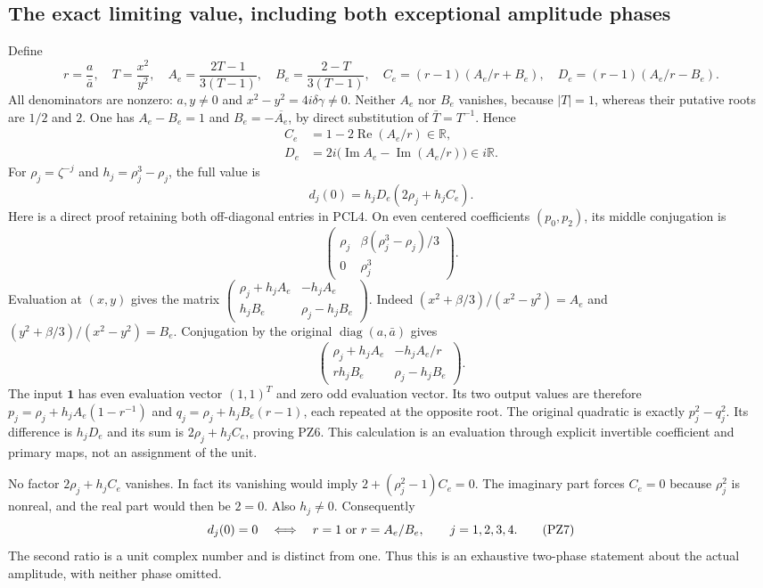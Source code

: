 \subsection{The exact limiting value, including both exceptional amplitude phases}
Define
\[
 r=\frac a{\bar a},\quad T=\frac{x^2}{y^2},\quad
 A_e=\frac{2T-1}{3(T-1)},\quad B_e=\frac{2-T}{3(T-1)},
 \quad C_e=(r-1)(A_e/r+B_e),\quad
 D_e=(r-1)(A_e/r-B_e).
 \tag{PZ4}
\]
All denominators are nonzero: $a,y\ne0$ and
$x^2-y^2=4i\delta\gamma\ne0$. Neither $A_e$ nor $B_e$ vanishes,
because $|T|=1$, whereas their putative roots are $1/2$ and $2$.
One has $A_e-B_e=1$ and $B_e=-\overline{A_e}$, by direct
substitution of $\bar T=T^{-1}$. Hence
\[
 \begin{split}
 C_e&=1-2\operatorname{Re}(A_e/r)\in\mathbb R,\\
 D_e&=2i\bigl(\operatorname{Im}A_e-
                      \operatorname{Im}(A_e/r)\bigr)\in i\mathbb R.
 \end{split}\tag{PZ5}
\]
For $\rho_j=\zeta^{-j}$ and $h_j=\rho_j^3-\rho_j$, the full value is
\[
 \boxed{\quad d_j(0)=h_jD_e(2\rho_j+h_jC_e).\quad}
 \tag{PZ6}
\]
Here is a direct proof retaining both off-diagonal entries in PCL4.
On even centered coefficients $(p_0,p_2)$, its middle conjugation is
\[
 \begin{pmatrix}\rho_j&\beta(\rho_j^3-\rho_j)/3\\0&\rho_j^3\end{pmatrix}.
\]
Evaluation at $(x,y)$ gives the matrix
$\left(\begin{smallmatrix}\rho_j+h_jA_e&-h_jA_e\\
h_jB_e&\rho_j-h_jB_e\end{smallmatrix}\right)$.
Indeed $(x^2+\beta/3)/(x^2-y^2)=A_e$ and
$(y^2+\beta/3)/(x^2-y^2)=B_e$. Conjugation by the original
$\operatorname{diag}(a,\bar a)$ gives
\[
 \begin{pmatrix}\rho_j+h_jA_e&-h_jA_e/r\\
 rh_jB_e&\rho_j-h_jB_e\end{pmatrix}.
\]
The input $\boldsymbol1$ has even evaluation vector $(1,1)^T$ and
zero odd evaluation vector. Its two output values are therefore
$p_j=\rho_j+h_jA_e(1-r^{-1})$ and
$q_j=\rho_j+h_jB_e(r-1)$, each repeated at the opposite root.
The original quadratic is exactly $p_j^2-q_j^2$.
Its difference is $h_jD_e$ and its sum is $2\rho_j+h_jC_e$,
proving PZ6. This calculation is an evaluation through explicit
invertible coefficient and primary maps, not an assignment of the unit.

No factor $2\rho_j+h_jC_e$ vanishes. In fact its vanishing would
imply $2+(\rho_j^2-1)C_e=0$. The imaginary part forces $C_e=0$
because $\rho_j^2$ is nonreal, and the real part would then be $2=0$.
Also $h_j\ne0$. Consequently
\[
 d_j(0)=0\quad\Longleftrightarrow\quad
 r=1\ \hbox{or}\ r=A_e/B_e,
 \qquad j=1,2,3,4.
 \tag{PZ7}
\]
The second ratio is a unit complex number and is distinct from one.
Thus this is an exhaustive two-phase statement about the actual
amplitude, with neither phase omitted.

